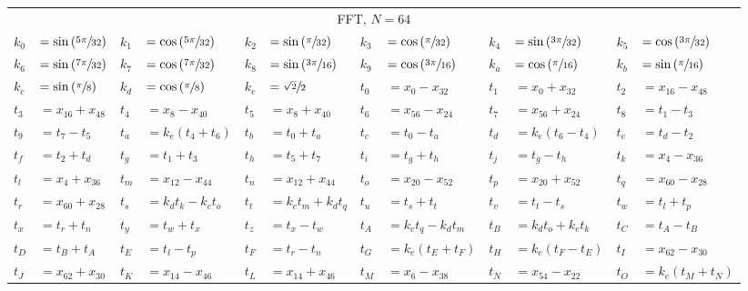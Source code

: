 \begin{tabular}{|p{4.3pt}l|p{4.3pt}l|p{4.3pt}l|p{4.3pt}l|p{4.3pt}l|p{4.3pt}l|}\toprule \multicolumn{12}{|c|}{FFT, $N=64$} \\
$k_0 $ &$= \sin\left(\sfrac{5\pi}{32}\right)$ & $k_1 $ &$= \cos\left(\sfrac{5\pi}{32}\right)$ & $k_2 $ &$= \sin\left(\sfrac{\pi}{32}\right)$ & $k_3 $ &$= \cos\left(\sfrac{\pi}{32}\right)$ & $k_4 $ &$= \sin\left(\sfrac{3\pi}{32}\right)$ & $k_5 $ &$= \cos\left(\sfrac{3\pi}{32}\right)$\\ 
$k_6 $ &$= \sin\left(\sfrac{7\pi}{32}\right)$ & $k_7 $ &$= \cos\left(\sfrac{7\pi}{32}\right)$ & $k_8 $ &$= \sin\left(\sfrac{3\pi}{16}\right)$ & $k_9 $ &$= \cos\left(\sfrac{3\pi}{16}\right)$ & $k_a $ &$= \cos\left(\sfrac{\pi}{16}\right)$ & $k_b $ &$= \sin\left(\sfrac{\pi}{16}\right)$\\ 
$k_c $ &$= \sin\left(\sfrac{\pi}{8}\right)$ & $k_d $ &$= \cos\left(\sfrac{\pi}{8}\right)$ & $k_e $ &$= \sfrac{\sqrt{2}}{2}$ & $t_0 $ &$= x_0 - x_{32}$ & $t_1 $ &$= x_0 + x_{32}$ & $t_2 $ &$= x_{16} - x_{48}$\\ 
$t_3 $ &$= x_{16} + x_{48}$ & $t_4 $ &$= x_8 - x_{40}$ & $t_5 $ &$= x_8 + x_{40}$ & $t_6 $ &$= x_{56} - x_{24}$ & $t_7 $ &$= x_{56} + x_{24}$ & $t_8 $ &$= t_1 - t_3$\\ 
$t_9 $ &$= t_7 - t_5$ & $t_a $ &$= k_e(t_4 + t_6)$ & $t_b $ &$= t_0 + t_a$ & $t_c $ &$= t_0 - t_a$ & $t_d $ &$= k_e(t_6 - t_4)$ & $t_e $ &$= t_d - t_2$\\ 
$t_f $ &$= t_2 + t_d$ & $t_g $ &$= t_1 + t_3$ & $t_h $ &$= t_5 + t_7$ & $t_i $ &$= t_g + t_h$ & $t_j $ &$= t_g - t_h$ & $t_k $ &$= x_4 - x_{36}$\\ 
$t_l $ &$= x_4 + x_{36}$ & $t_m $ &$= x_{12} - x_{44}$ & $t_n $ &$= x_{12} + x_{44}$ & $t_o $ &$= x_{20} - x_{52}$ & $t_p $ &$= x_{20} + x_{52}$ & $t_q $ &$= x_{60} - x_{28}$\\ 
$t_r $ &$= x_{60} + x_{28}$ & $t_s $ &$= k_dt_k - k_ct_o$ & $t_t $ &$= k_ct_m + k_dt_q$ & $t_u $ &$= t_s + t_t$ & $t_v $ &$= t_t - t_s$ & $t_w $ &$= t_l + t_p$\\ 
$t_x $ &$= t_r + t_n$ & $t_y $ &$= t_w + t_x$ & $t_z $ &$= t_x - t_w$ & $t_A $ &$= k_ct_q - k_dt_m$ & $t_B $ &$= k_dt_o + k_ct_k$ & $t_C $ &$= t_A - t_B$\\ 
$t_D $ &$= t_B + t_A$ & $t_E $ &$= t_l - t_p$ & $t_F $ &$= t_r - t_n$ & $t_G $ &$= k_e(t_E + t_F)$ & $t_H $ &$= k_e(t_F - t_E)$ & $t_I $ &$= x_{62} - x_{30}$\\ 
$t_J $ &$= x_{62} + x_{30}$ & $t_K $ &$= x_{14} - x_{46}$ & $t_L $ &$= x_{14} + x_{46}$ & $t_M $ &$= x_6 - x_{38}$ & $t_N $ &$= x_{54} - x_{22}$ & $t_O $ &$= k_e(t_M + t_N)$\\ 

\end{tabular}
